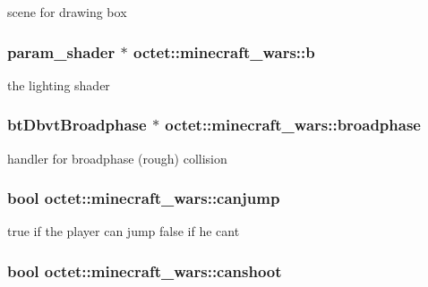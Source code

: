 scene for drawing box 

\hypertarget{classoctet_1_1minecraft__wars_a2e5ca51c2373b40b1613c9ad818f7a39}{
\subsubsection[{b}]{\setlength{\rightskip}{0pt plus 5cm}param\+\_\+shader $\ast$ octet\+::minecraft\+\_\+wars\+::b\hspace{0.3cm}{\ttfamily [private]}}}\label{classoctet_1_1minecraft__wars_a2e5ca51c2373b40b1613c9ad818f7a39}


the lighting shader 

\hypertarget{classoctet_1_1minecraft__wars_a3f2bdb1f69ade79860ca22618cef0040}{
\subsubsection[{broadphase}]{\setlength{\rightskip}{0pt plus 5cm}bt\+Dbvt\+Broadphase $\ast$ octet\+::minecraft\+\_\+wars\+::broadphase\hspace{0.3cm}{\ttfamily [private]}}}\label{classoctet_1_1minecraft__wars_a3f2bdb1f69ade79860ca22618cef0040}


handler for broadphase (rough) collision 

\hypertarget{classoctet_1_1minecraft__wars_abf8f37ba4570f98b1361919b56460df2}{
\subsubsection[{canjump}]{\setlength{\rightskip}{0pt plus 5cm}bool octet\+::minecraft\+\_\+wars\+::canjump\hspace{0.3cm}{\ttfamily [private]}}}\label{classoctet_1_1minecraft__wars_abf8f37ba4570f98b1361919b56460df2}


true if the player can jump false if he cant 

\hypertarget{classoctet_1_1minecraft__wars_a33d14857ff44463f24ca76747c762745}{
\subsubsection[{canshoot}]{\setlength{\rightskip}{0pt plus 5cm}bool octet\+::minecraft\+\_\+wars\+::canshoot\hspace{0.3cm}{\ttfamily [private]}}}\label{classoctet_1_1minecraft__wars_a33d14857ff44463f24ca76747c762745}


